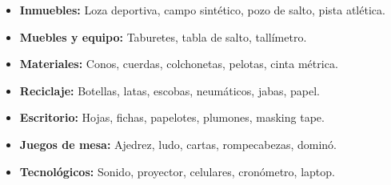 \documentclass[11pt,a4paper]{article}
\begin{document}
\begin{tcolorbox}[
    enhanced,
    colback=white,
    colframe=azultitulo,
    arc=5pt,
    boxrule=0.5pt,
    left=6pt, right=6pt, top=4pt, bottom=4pt,
    borderline west={2pt}{0pt}{azultitulo},
    drop shadow,
]

\begin{itemize}[leftmargin=1.5em, itemsep=0.4em]
  \item \textbf{Inmuebles:} Loza deportiva, campo sintético, pozo de salto, pista atlética.
  \item \textbf{Muebles y equipo:} Taburetes, tabla de salto, tallímetro.
  \item \textbf{Materiales:} Conos, cuerdas, colchonetas, pelotas, cinta métrica.
  \item \textbf{Reciclaje:} Botellas, latas, escobas, neumáticos, jabas, papel.
  \item \textbf{Escritorio:} Hojas, fichas, papelotes, plumones, masking tape.
  \item \textbf{Juegos de mesa:} Ajedrez, ludo, cartas, rompecabezas, dominó.
  \item \textbf{Tecnológicos:} Sonido, proyector, celulares, cronómetro, laptop.
\end{itemize}
\end{tcolorbox}

\vspace{0.8em}

\vspace{0.5em}
\printbibliography[heading=none]



\vspace{4.0cm}
\end{document}
